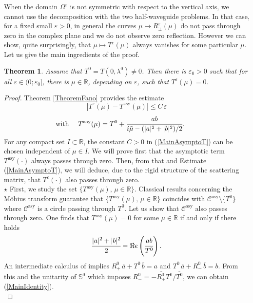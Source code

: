 \documentclass[11pt,a4paper]{report}
\newcommand{\eps}{\varepsilon}
\newcommand{\Om}{\Omega}
\newcommand{\mrm}[1]{\mathrm{#1}}
\newcommand{\R}{\mathbb{R}}
\newtheorem{theorem}{Theorem}[chapter]
\begin{document}
\noindent When the domain $\Om^\eps$ is not symmetric with respect to the vertical axis, we cannot use the decomposition with the two half-waveguide problems. In that case, for a fixed small $\eps>0$, in general the curves $\mu\mapsto R^\eps_\pm(\mu)$ do not pass through zero in the complex plane and we do not observe zero reflection. However we can show, quite surprisingly, that $\mu\mapsto T^\eps(\mu)$ always vanishes for some particular $\mu$. Let us give the main ingredients of the proof.
\begin{theorem}\label{MainThmPart1}
Assume that $T^0=T(0,\lambda^0)\ne0$. Then there is $\eps_0>0$ such that for all $\eps\in(0;\eps_0]$, there is $\mu\in\R$, depending on $\eps$, such that $T^\eps(\mu)=0$.
\end{theorem}
\begin{proof}
Theorem \ref{TheoremFano} provides the estimate
\begin{equation}\label{MainAsymptoT}
|T^{\eps}(\mu)-T^{\mrm{asy}}(\mu)|\le C\,\eps
\end{equation}
\[
\hspace{-0.7cm}\mbox{with }\quad T^{\mrm{asy}}(\mu)=T^0+\cfrac{ab}{i\tilde{\mu}-(|a|^2+|b|^2)/2}.
\]
For any compact set $I\subset\R$, the constant $C>0$ in (\ref{MainAsymptoT}) can be chosen independent of $\mu\in I$. We will prove first that the asymptotic term  $T^{\mrm{asy}}(\cdot)$ always passes through zero. Then, from that and Estimate (\ref{MainAsymptoT}), we will deduce, due to the rigid structure of the scattering matrix, that $T^{\eps}(\cdot)$ also passes through zero.\\[2pt]
$\star$ First, we study the set $\{T^{\mrm{asy}}(\mu),\,\mu\in\R\}$. Classical results concerning the M\"{o}bius transform guarantee that $\{T^{\mrm{asy}}(\mu),\,\mu\in\R\}$ coincides with $\mathscr{C}^{\mrm{asy}}\setminus\{T^0\}$ where $\mathscr{C}^{\mrm{asy}}$ is a circle passing through $T^0$. Let us show that $\mathscr{C}^{\mrm{asy}}$ also passes through zero. One finds that $T^{\mrm{asy}}(\mu)=0$ for some $\mu\in\R$ if and only if there holds 
\begin{equation}\label{MainIdentity}
\cfrac{|a|^2+|b|^2}{2}=\Re e\left(\cfrac{ab}{T^0}\right).
\end{equation}
An intermediate calculus of \cite{ChNa18} implies $R^0_+\,\overline{a}+T^0\,\overline{b}=a$ and $T^0\,\overline{a}+R^0_-\,\overline{b}=b$. From this and the unitarity of $\mathbb{S}^{0}$ which imposes $R^0_-=-\overline{R^{0}_+} T^{0}/\overline{T^{0}}$, we can obtain (\ref{MainIdentity}).\\ 

\end{proof}
\end{document}
